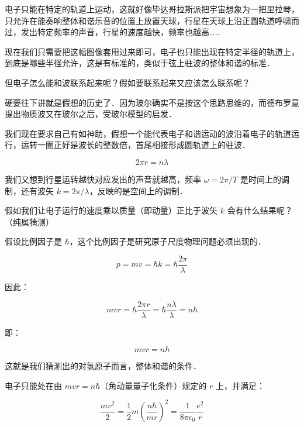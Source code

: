 电子只能在特定的轨道上运动，这就好像毕达哥拉斯派把宇宙想象为一把里拉琴，只允许在能奏响整体和谐乐音的位置上放置天球，行星在天球上沿正圆轨道呼啸而过，发出特定频率的声音，行星的速度越快，频率也越高……

现在我们只需要把这幅图像套用过来即可，电子也只能出现在特定半径的轨道上，到底是哪些半径允许，这是有标准的，类似于弦上驻波的整体和谐的标准．


但电子怎么能和波联系起来呢？假如要联系起来又应该怎么联系呢？

硬要往下讲就是假想的历史了．因为玻尔确实不是按这个思路思维的，而德布罗意提出物质波又在玻尔之后，受玻尔模型的启发．

我们现在要求自己有如神助，假想一个能代表电子和谐运动的波沿着电子的轨道运行，运转一圈正好是波长的整数倍，首尾相接形成圆轨道上的驻波．

\begin{equation}
2 \pi r = n \lambda
\end{equation}

我们又想到行星运转越快对应发出的声音就越高，频率 $\omega = 2 \pi /T$ 是时间上的调制，还有波矢 $k = 2 \pi / \lambda$，反映的是空间上的调制．

假如我们让电子运行的速度乘以质量（即动量）正比于波矢 $k$ 会有什么结果呢？（纯属猜测）

假设比例因子是 $\hbar$，这个比例因子是研究原子尺度物理问题必须出现的．

\begin{equation}
p = m v = \hbar k = \hbar \frac{2 \pi }{\lambda}
\end{equation}

因此：

\begin{equation}
m v r = \hbar \frac{2 \pi r}{\lambda} = \hbar \frac{ n \lambda }{ \lambda} = n \hbar
\end{equation}

即：

\begin{equation}
mvr = n \hbar 
\end{equation}

这就是我们猜测出的对氢原子而言，整体和谐的条件．

电子只能处在由 $mvr=n \hbar$（角动量量子化条件）规定的 $r$ 上，并满足：

\begin{equation}
\frac{m v^2}{2} = \frac{1}{2} m \left(  \frac{ n \hbar  }{ m r }  \right)^2 = \frac{1}{8 \pi \epsilon_0 } \frac{e^2 }{r }  
\end{equation}

